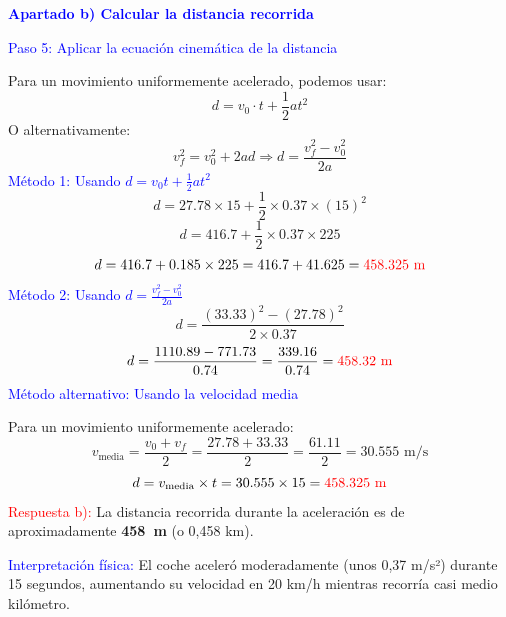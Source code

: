 \begin{exercise}
\begin{solu}
        \vspace{0.5cm}

        \textbf{\textcolor{blue}{Apartado b) Calcular la distancia recorrida}}

        \textcolor{blue}{Paso 5: Aplicar la ecuación cinemática de la distancia}

        Para un movimiento uniformemente acelerado, podemos usar:
        \[
            \boxed{d = v_0 \cdot t + \frac{1}{2} a t^2}
        \]
        O alternativamente:
        \[
            \boxed{v_f^2 = v_0^2 + 2ad} \Rightarrow d = \frac{v_f^2 - v_0^2}{2a}
        \]
        \textcolor{blue}{Método 1: Usando $d = v_0 t + \frac{1}{2}at^2$}
        \[
            d = 27.78 \times 15 + \frac{1}{2} \times 0.37 \times (15)^2
        \]
        \[
            d = 416.7 + \frac{1}{2} \times 0.37 \times 225
        \]
        \[
            d = 416.7 + 0.185 \times 225 = 416.7 + 41.625 = \textcolor{red}{458.325 \text{ m}}
        \]
        \textcolor{blue}{Método 2: Usando $d = \frac{v_f^2 - v_0^2}{2a}$}
        \[
            d = \frac{(33.33)^2 - (27.78)^2}{2 \times 0.37}
        \]
        \[
            d = \frac{1110.89 - 771.73}{0.74} = \frac{339.16}{0.74} = \textcolor{red}{458.32 \text{ m}}
        \]
        \textcolor{blue}{Método alternativo: Usando la velocidad media}

        Para un movimiento uniformemente acelerado:
        \[
            v_{\text{media}} = \frac{v_0 + v_f}{2} = \frac{27.78 + 33.33}{2} = \frac{61.11}{2} = 30.555 \text{ m/s}
        \]
        \[
            d = v_{\text{media}} \times t = 30.555 \times 15 = \textcolor{red}{458.325 \text{ m}}
        \]
        \textcolor{red}{Respuesta b):} La distancia recorrida durante la aceleración es de aproximadamente \textbf{\qty{458}{\m}} (o 0,458 km).

        \textcolor{blue}{Interpretación física:} El coche aceleró moderadamente (unos 0,37 m/s²) durante 15 segundos, aumentando su velocidad en 20 km/h mientras recorría casi medio kilómetro.
    \end{solu}
\end{exercise}

